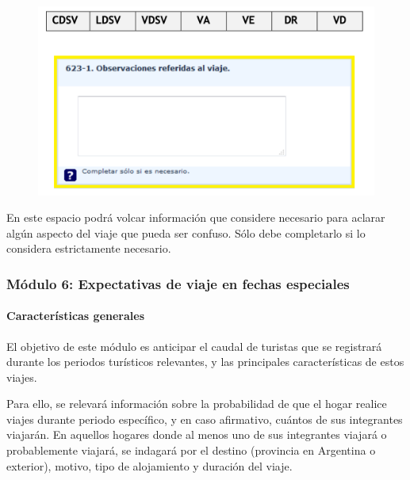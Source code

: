\documentclass[
  openany]{book}
\begin{document}
\begin{figure}

{\centering \includegraphics[width=1\linewidth]{imagenes/figura6-127} 

}

\end{figure}

En este espacio podrá volcar información que considere necesario para aclarar algún aspecto del viaje que pueda ser confuso. Sólo debe completarlo si lo considera estrictamente necesario.

\hypertarget{muxf3dulo-6-expectativas-de-viaje-en-fechas-especiales}{%
\subsubsection{Módulo 6: Expectativas de viaje en fechas especiales}\label{muxf3dulo-6-expectativas-de-viaje-en-fechas-especiales}}

\hypertarget{caracteruxedsticas-generales}{%
\paragraph{Características generales}\label{caracteruxedsticas-generales}}

El objetivo de este módulo es anticipar el caudal de turistas que se registrará durante los periodos turísticos relevantes, y las principales características de estos viajes.

Para ello, se relevará información sobre la probabilidad de que el hogar realice viajes durante periodo específico, y en caso afirmativo, cuántos de sus integrantes viajarán. En aquellos hogares donde al menos uno de sus integrantes viajará o probablemente viajará, se indagará por el destino (provincia en Argentina o exterior), motivo, tipo de alojamiento y duración del viaje.
\end{document}
